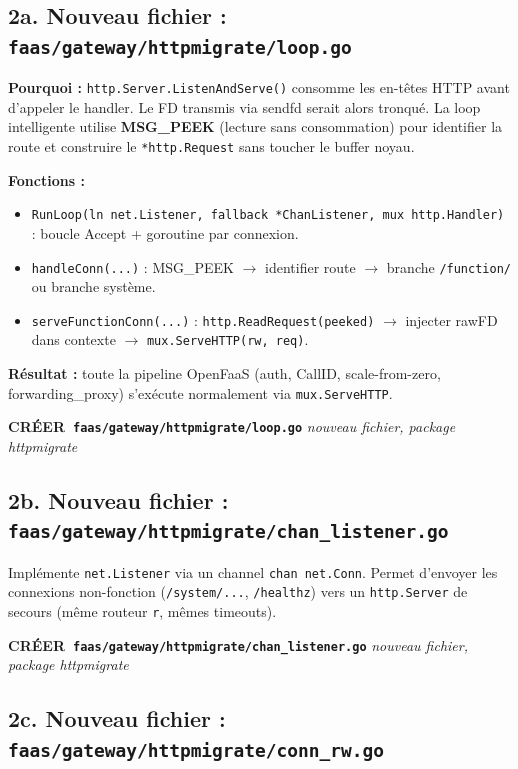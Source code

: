 \documentclass[11pt,a4paper]{article}
\newcommand{\act}[3]{%
  \vspace{0.2em}
  \noindent\colorbox{actionbg}{\parbox{\dimexpr\linewidth-2\fboxsep\relax}{%
    \small\textbf{#1~\texttt{#2}} \hfill \textit{\small #3}\\[-0.3em]
  }}
  \vspace{0.2em}
}
\begin{document}
\subsection*{2a. Nouveau fichier : \texttt{faas/gateway/httpmigrate/loop.go}}

\textbf{Pourquoi :} \texttt{http.Server.ListenAndServe()} consomme les en-têtes HTTP avant
d'appeler le handler. Le FD transmis via sendfd serait alors tronqué. La loop intelligente
utilise \textbf{MSG\_PEEK} (lecture sans consommation) pour identifier la route et construire
le \texttt{*http.Request} sans toucher le buffer noyau.

\textbf{Fonctions :}
\begin{itemize}[noitemsep]
  \item \texttt{RunLoop(ln net.Listener, fallback *ChanListener, mux http.Handler)} :
    boucle Accept + goroutine par connexion.
  \item \texttt{handleConn(...)} : MSG\_PEEK $\to$ identifier route $\to$ branche
    \texttt{/function/} ou branche système.
  \item \texttt{serveFunctionConn(...)} : \texttt{http.ReadRequest(peeked)} $\to$ injecter
    rawFD dans contexte $\to$ \texttt{mux.ServeHTTP(rw, req)}.
\end{itemize}

\textbf{Résultat :} toute la pipeline OpenFaaS (auth, CallID, scale-from-zero, forwarding\_proxy)
s'exécute normalement via \texttt{mux.ServeHTTP}.

\act{CRÉER}{faas/gateway/httpmigrate/loop.go}{nouveau fichier, package httpmigrate}

\subsection*{2b. Nouveau fichier : \texttt{faas/gateway/httpmigrate/chan\_listener.go}}

Implémente \texttt{net.Listener} via un channel \texttt{chan net.Conn}.
Permet d'envoyer les connexions non-fonction (\texttt{/system/...}, \texttt{/healthz})
vers un \texttt{http.Server} de secours (même routeur \texttt{r}, mêmes timeouts).

\act{CRÉER}{faas/gateway/httpmigrate/chan\_listener.go}{nouveau fichier, package httpmigrate}

\subsection*{2c. Nouveau fichier : \texttt{faas/gateway/httpmigrate/conn\_rw.go}}
\end{document}

